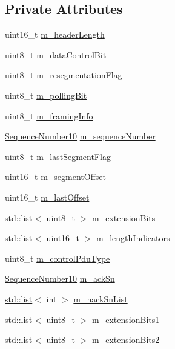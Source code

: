 \subsection*{Private Attributes}
\begin{DoxyCompactItemize}
\item 
uint16\+\_\+t \hyperlink{classns3_1_1LteRlcAmHeader_a3c565f3b6b45d813ea11f05118898fe8}{m\+\_\+header\+Length}
\item 
uint8\+\_\+t \hyperlink{classns3_1_1LteRlcAmHeader_a6931b700f09fba1fd4249b027b6bf5ee}{m\+\_\+data\+Control\+Bit}
\item 
uint8\+\_\+t \hyperlink{classns3_1_1LteRlcAmHeader_acc84b28a7fb612bd28d1fd4a1646a5ea}{m\+\_\+resegmentation\+Flag}
\item 
uint8\+\_\+t \hyperlink{classns3_1_1LteRlcAmHeader_ae03d21acce0c756a826079ad9bbd88d6}{m\+\_\+polling\+Bit}
\item 
uint8\+\_\+t \hyperlink{classns3_1_1LteRlcAmHeader_ac85a4d100aba414b051cc090b9399c46}{m\+\_\+framing\+Info}
\item 
\hyperlink{classns3_1_1SequenceNumber10}{Sequence\+Number10} \hyperlink{classns3_1_1LteRlcAmHeader_a524ef81f1d7f15e1b19f6487c1d11921}{m\+\_\+sequence\+Number}
\item 
uint8\+\_\+t \hyperlink{classns3_1_1LteRlcAmHeader_ae4480cd1d8b06c31c99bdda06c1ebdd7}{m\+\_\+last\+Segment\+Flag}
\item 
uint16\+\_\+t \hyperlink{classns3_1_1LteRlcAmHeader_aaab2313fbca4a24854b05767219216f4}{m\+\_\+segment\+Offset}
\item 
uint16\+\_\+t \hyperlink{classns3_1_1LteRlcAmHeader_a5bfb0edfc4cef2ecb484448e466d6f14}{m\+\_\+last\+Offset}
\item 
\hyperlink{openflow-interface_8h_afd9bcfa176617760671b67580f536fa7}{std\+::list}$<$ uint8\+\_\+t $>$ \hyperlink{classns3_1_1LteRlcAmHeader_a74d6d748a89f21632a351e02adb7c0ad}{m\+\_\+extension\+Bits}
\item 
\hyperlink{openflow-interface_8h_afd9bcfa176617760671b67580f536fa7}{std\+::list}$<$ uint16\+\_\+t $>$ \hyperlink{classns3_1_1LteRlcAmHeader_af844efce56d400df7aa9224c4df37f84}{m\+\_\+length\+Indicators}
\item 
uint8\+\_\+t \hyperlink{classns3_1_1LteRlcAmHeader_a9e0eb15e5fc0eeda48c0b62cd5f3fd1d}{m\+\_\+control\+Pdu\+Type}
\item 
\hyperlink{classns3_1_1SequenceNumber10}{Sequence\+Number10} \hyperlink{classns3_1_1LteRlcAmHeader_a95d8ee6ccdb69d68bd28c8a8f3257b1c}{m\+\_\+ack\+Sn}
\item 
\hyperlink{openflow-interface_8h_afd9bcfa176617760671b67580f536fa7}{std\+::list}$<$ int $>$ \hyperlink{classns3_1_1LteRlcAmHeader_ae9feb3d09099ed90ed014d3f0fa8591b}{m\+\_\+nack\+Sn\+List}
\item 
\hyperlink{openflow-interface_8h_afd9bcfa176617760671b67580f536fa7}{std\+::list}$<$ uint8\+\_\+t $>$ \hyperlink{classns3_1_1LteRlcAmHeader_ac2aee2705eb3bb06ba27d1db3c415e2f}{m\+\_\+extension\+Bits1}
\item 
\hyperlink{openflow-interface_8h_afd9bcfa176617760671b67580f536fa7}{std\+::list}$<$ uint8\+\_\+t $>$ \hyperlink{classns3_1_1LteRlcAmHeader_ab37273bc099f7980862d0a8af0cb11ff}{m\+\_\+extension\+Bits2}
\end{DoxyCompactItemize}
